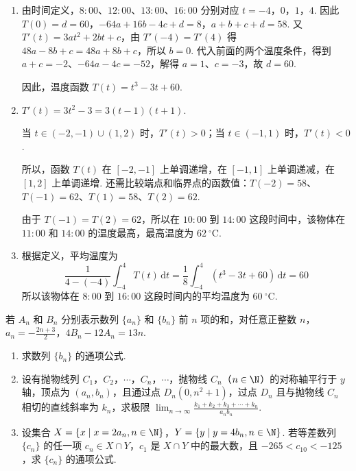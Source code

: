 \documentclass[UTF8,a4paper,oneside,11pt]{ctexbook}
\begin{document}
\begin{solution}
\begin{enumerate}
\item 由时间定义，\(8{:}00\)、\(12{:}00\)、\(13{:}00\)、\(16{:}00\) 分别对应 \(t=-4\)，\(0\)，\(1\)，\(4\). 因此
\(T(0)=d=60\)，\(-64a+16b-4c+d=8\)，\(a+b+c+d=58\). 又 \(T'(t)=3at^2+2bt+c\)，由 \(T'(-4)=T'(4)\) 得 \(48a-8b+c=48a+8b+c\)，所以 \(b=0\). 代入前面的两个温度条件，得到 \(a+c=-2\)、\(-64a-4c=-52\)，解得 \(a=1\)、\(c=-3\)，故 \(d=60\).

因此，温度函数 \(T(t)=t^{3}-3t+60\).

\item \(T'(t)=3t^{2}-3=3(t-1)(t+1)\).

当 \(t\in(-2,-1)\cup(1,2)\) 时，\(T'(t)>0\)；当 \(t\in(-1,1)\) 时，\(T'(t)<0\).

所以，函数 \(T(t)\) 在 \([-2,-1]\) 上单调递增，在 \([-1,1]\) 上单调递减，在 \([1,2]\) 上单调递增. 还需比较端点和临界点的函数值：\(T(-2)=58\)、\(T(-1)=62\)、\(T(1)=58\)、\(T(2)=62\).

由于 \(T(-1)=T(2)=62\)，所以在 \(10{:}00\) 到 \(14{:}00\) 这段时间中，该物体在 \(11{:}00\) 和 \(14{:}00\) 的温度最高，最高温度为 \(62\mathrm{~^{\circ}C}\).

\item 根据定义，平均温度为
\[
\frac{1}{4-(-4)}\int_{-4}^{4}T(t)\,\mathrm{d}t
=\frac{1}{8}\int_{-4}^{4}(t^{3}-3t+60)\,\mathrm{d}t
=60
\]
所以该物体在 \(8{:}00\) 到 \(16{:}00\) 这段时间内的平均温度为 \(60\mathrm{~^{\circ}C}\).
\end{enumerate}
\end{solution}

\begin{problem}
若 \(A_n\) 和 \(B_n\) 分别表示数列 \(\{a_n\}\) 和 \(\{b_n\}\) 前 \(n\) 项的和，对任意正整数 \(n\)，\(a_n = -\frac{2n + 3}{2}\)，\(4B_n - 12A_n = 13n\).

\begin{enumerate}
\item 求数列 \(\{b_n\}\) 的通项公式.
\item 设有抛物线列 \(C_1\)，\(C_2\)，\(\cdots\)，\(C_n\)，\(\cdots\)，抛物线 \(C_n\)（\(n \in \N\)）的对称轴平行于 \(y\) 轴，顶点为 \((a_n, b_n)\)，且通过点 \(D_n(0, n^{2} + 1)\)，过点 \(D_n\) 且与抛物线 \(C_n\) 相切的直线斜率为 \(k_n\)，求极限 \(\displaystyle \lim_{n \to \infty} \frac{k_1 + k_2 + k_3 + \cdots + k_n}{a_n b_n}\).
\item 设集合 \(X = \{x \mid x = 2a_n, n \in \N\}\)，\(Y = \{y \mid y = 4b_n, n \in \N\}\). 若等差数列 \(\{c_n\}\) 的任一项 \(c_n \in X \cap Y\)，\(c_1\) 是 \(X \cap Y\) 中的最大数，且 \(-265 < c_{10} < -125\)，求 \(\{c_n\}\) 的通项公式.
\end{enumerate}
\end{problem}
\end{document}
